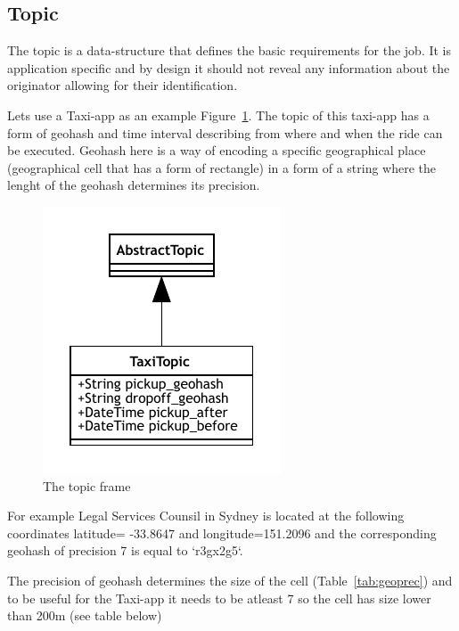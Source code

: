 \documentclass{article}
\begin{document}
\subsection{Topic}

The topic is a data-structure that defines the basic requirements for the job. It is application specific and by design it should not reveal any information about the originator allowing for their identification.

Lets use a Taxi-app as an example {Figure~\ref{fig:fr:topic}}. The topic of this taxi-app has a form of geohash and time interval describing from where and when the ride can be executed. Geohash here is a way of encoding a specific geographical place (geographical cell that has a form of rectangle) in a form of a string where the lenght of the geohash determines its precision.

\begin{figure}
	\centering
	\includegraphics[scale=1.0]{Topic.pdf}
	\caption{The topic frame}
	\label{fig:fr:topic}
\end{figure}


For example Legal Services Counsil in Sydney is located at the following coordinates latitude= -33.8647 and longitude=151.2096 and the corresponding geohash of precision 7 is equal to `r3gx2g5`.

The precision of geohash determines the size of the cell (Table~\ref{tab:geoprec}) and to be useful for the Taxi-app it needs to be atleast 7 so the cell has size lower than 200m (see table below)
\end{document}
